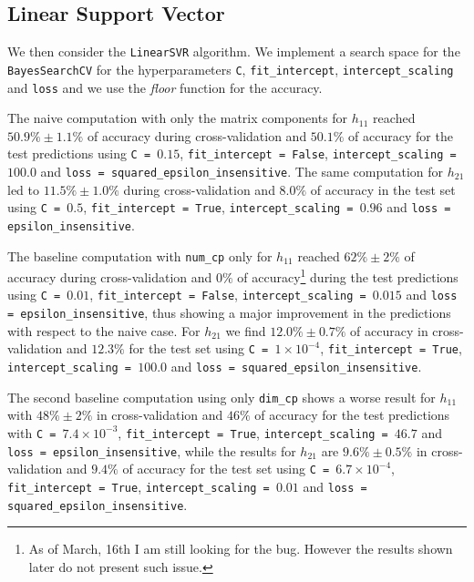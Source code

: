 \subsection{Linear Support Vector}
    We then consider the \texttt{LinearSVR} algorithm. We implement a search space for the \texttt{BayesSearchCV} for the hyperparameters \texttt{C}, \texttt{fit\_intercept}, \texttt{intercept\_scaling} and \texttt{loss} and we use the \textit{floor} function for the accuracy.
    
    The naive computation with only the matrix components for $h_{11}$ reached $50.9\% \pm 1.1\%$ of accuracy during cross-validation and $50.1\%$ of accuracy for the test predictions using  \texttt{C = $0.15$}, \texttt{fit\_intercept = False}, \texttt{intercept\_scaling = $100.0$} and \texttt{loss = squared\_epsilon\_insensitive}. The same computation for $h_{21}$ led to $11.5\% \pm 1.0\%$ during cross-validation and $8.0\%$ of accuracy in the test set using \texttt{C = $0.5$}, \texttt{fit\_intercept = True}, \texttt{intercept\_scaling = $0.96$} and \texttt{loss = epsilon\_insensitive}.
    
    The baseline computation with \texttt{num\_cp} only for $h_{11}$ reached $62\% \pm 2\%$ of accuracy during cross-validation and $0\%$ of accuracy\footnote{As of March, 16th I am still looking for the bug. However the results shown later do not present such issue.} during the test predictions using \texttt{C = $0.01$}, \texttt{fit\_intercept = False}, \texttt{intercept\_scaling = $0.015$} and \texttt{loss = epsilon\_insensitive}, thus showing a major improvement in the predictions with respect to the naive case. For $h_{21}$ we find $12.0\% \pm 0.7\%$ of accuracy in cross-validation and $12.3\%$ for the test set using \texttt{C = $1 \times 10^{-4}$}, \texttt{fit\_intercept = True}, \texttt{intercept\_scaling = $100.0$} and \texttt{loss = squared\_epsilon\_insensitive}.
    
    The second baseline computation using only \texttt{dim\_cp} shows a worse result for $h_{11}$ with $48\% \pm 2\%$ in cross-validation and $46\%$ of accuracy for the test predictions with \texttt{C = $7.4 \times 10^{-3}$}, \texttt{fit\_intercept = True}, \texttt{intercept\_scaling = $46.7$} and \texttt{loss = epsilon\_insensitive}, while the results for $h_{21}$ are $9.6\% \pm 0.5\%$ in cross-validation and $9.4\%$ of accuracy for the test set using \texttt{C = $6.7 \times 10^{-4}$}, \texttt{fit\_intercept = True}, \texttt{intercept\_scaling = $0.01$} and \texttt{loss = squared\_epsilon\_insensitive}.
    
